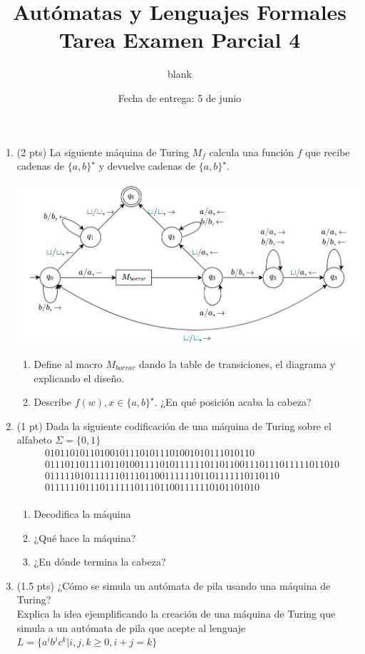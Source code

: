 \documentclass{article}
\title{
    Autómatas y Lenguajes Formales \\
    Tarea Examen Parcial 4
}
\date{
    Fecha de entrega: 5 de junio
}
\author{blank}
\begin{document}
    \maketitle

    \begin{enumerate}
        \item (2 pts) La siguiente máquina de Turing $M_f$ calcula una función
        $f$ que recibe cadenas de $\{a, b\}^{\star}$ y devuelve cadenas de 
        $\{a, b\}^{\star}$.
        \begin{center}
            \includegraphics[scale=0.5]{automata1.png}
        \end{center}
        \begin{enumerate}
            \item Define al macro $M_{borrar}$ dando la table de transiciones,
            el diagrama y explicando el diseño.
            \item Describe $f(w), x \in \{a, b\}^{\star}$. ¿En qué posición 
            acaba la cabeza?
        \end{enumerate}

        \item (1 pt) Dada la siguiente codificación de una máquina de Turing sobre el 
        alfabeto $\Sigma = \{0, 1\}$
        \begin{align*}
            &010110101101001011101011101001010111010110 \\
            &01110110111101101001111010111111011011001110111011111011010 \\
            &01111101011111101110110011111101101111110110110 \\
            &0111111011101111110111011001111110101101010 \\
        \end{align*}
        \begin{enumerate}
            \item Decodifica la máquina
            \item ¿Qué hace la máquina?
            \item ¿En dónde termina la cabeza?
        \end{enumerate}
        \item (1.5 pts) ¿Cómo se simula un autómata de pila usando una máquina 
        de Turing?\\
        Explica la idea ejemplificando la creación de una máquina de Turing que
        simula a un autómata de pila que acepte al lenguaje 
        $L = \{a^ib^jc^k | i, j, k \geq 0, i + j = k\}$ 
        

\end{enumerate}
\end{document}
